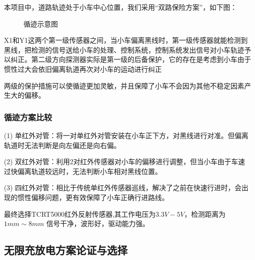 \documentclass[UTF8]{ctexart}
\begin{document}
本项目中，道路轨迹处于小车中心位置，我们采用“双路保险方案”，如下图：

\begin{figure}[H]   
	\centering	  
	\label{}\hfil
	\label{}
	\caption{循迹示意图}	 	 
	\label{fig3} 
\end{figure}


X1和Y1这两个第一级传感器之间，当小车偏离黑线时，第一级传感器就能检测到黑线，把检测的信号送给小车的处理、控制系统，控制系统发出信号对小车轨迹予以纠正。第二级方向探测器实际是第一级的后备保护，它的存在是考虑到小车由于惯性过大会依旧偏离轨道再次对小车的运动进行纠正

两级的保护措施可以使循迹更加灵敏，并且保障了小车不会因为其他不稳定因素产生大的偏移。
\subsubsection{循迹方案比较}
(1) 单红外对管：将一对单红外对管安装在小车正下方，对黑线进行对准。但偏离轨道时无法判断是向左偏还是向右偏。

(2) 双红外对管：利用2对红外传感器对小车的偏移进行调整，但当小车由于车速过快偏离轨道较远时，无法判断小车相对黑线位置。

(3) 四红外对管：相比于传统单红外传感器巡线，解决了之前在快速行进时，会出现的惯性偏移问题，更有效保障了小车正确行进路线。

最终选择TCRT5000红外反射传感器,其工作电压为$ 3.3V-5V $，检测距离为 $ 1mm\sim 8mm $ 信号干净，波形好，驱动能力强。
\subsection{无限充放电方案论证与选择}
\end{document}
